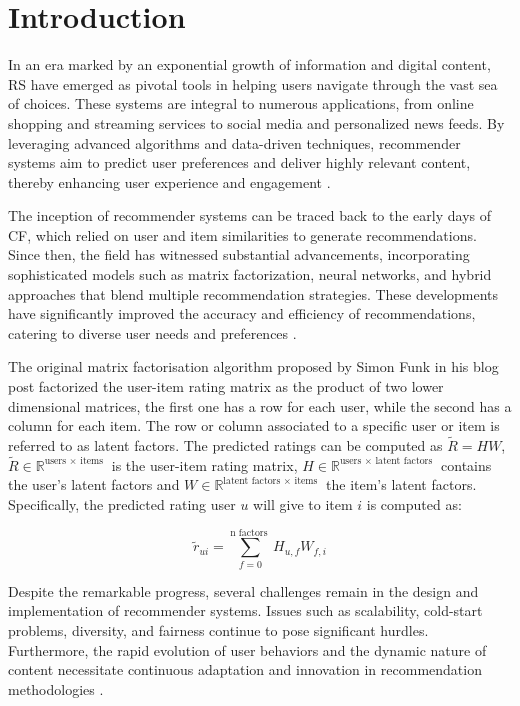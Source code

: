 \chapter{Introduction}\label{ch:introduction}

In an era marked by an exponential growth of information and digital content, \ac{RS} have emerged as pivotal tools in helping users navigate through the vast sea of choices. These systems are integral to numerous applications, from online shopping and streaming services to social media and personalized news feeds. By leveraging advanced algorithms and data-driven techniques, recommender systems aim to predict user preferences and deliver highly relevant content, thereby enhancing user experience and engagement \autocite{seneca}.

The inception of recommender systems can be traced back to the early days of \ac{CF}, which relied on user and item similarities to generate recommendations. Since then, the field has witnessed substantial advancements, incorporating sophisticated models such as matrix factorization, neural networks, and hybrid approaches that blend multiple recommendation strategies. These developments have significantly improved the accuracy and efficiency of recommendations, catering to diverse user needs and preferences \autocite{taleb:2010}.

The original matrix factorisation algorithm proposed by Simon Funk in his blog post factorized the user-item rating matrix as the product of two lower dimensional matrices, the first one has a row for each user, while the second has a column for each item. The row or column associated to a specific user or item is referred to as latent factors. The predicted ratings can be computed as $\tilde{R}=H W$, $\tilde{R} \in \mathbb{R}^{\text {users } \times \text { items }}$ is the user-item rating matrix, $H \in \mathbb{R}^{\text {users } \times \text { latent factors }}$ contains the user's latent factors and  $W \in \mathbb{R}^{\text {latent factors } \times \text { items }}$ the item's latent factors. Specifically, the predicted rating user $u$ will give to item $i$ is computed as:

\begin{equation}
	\tilde{r}_{u i}=\sum_{f=0}^{\mathrm{n} \text { factors }} H_{u, f} W_{f, i}
\end{equation}

Despite the remarkable progress, several challenges remain in the design and implementation of recommender systems. Issues such as scalability, cold-start problems, diversity, and fairness continue to pose significant hurdles. Furthermore, the rapid evolution of user behaviors and the dynamic nature of content necessitate continuous adaptation and innovation in recommendation methodologies \autocite{adams:2013}.

